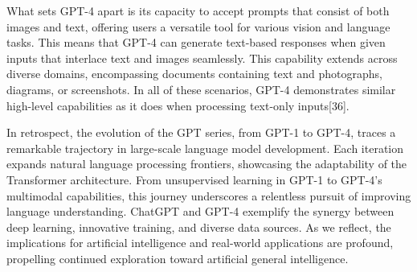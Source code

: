 \documentclass[conference]{IEEEtran}
\begin{document}
What sets GPT-4 apart is its capacity to accept prompts that consist of both images and text, offering users a versatile tool for various vision and language tasks. This means that GPT-4 can generate text-based responses when given inputs that interlace text and images seamlessly. This capability extends across diverse domains, encompassing documents containing text and photographs, diagrams, or screenshots. In all of these scenarios, GPT-4 demonstrates similar high-level capabilities as it does when processing text-only inputs[36].

In retrospect, the evolution of the GPT series, from GPT-1 to GPT-4, traces a remarkable trajectory in large-scale language model development. Each iteration expands natural language processing frontiers, showcasing the adaptability of the Transformer architecture. From unsupervised learning in GPT-1 to GPT-4's multimodal capabilities, this journey underscores a relentless pursuit of improving language understanding. ChatGPT and GPT-4 exemplify the synergy between deep learning, innovative training, and diverse data sources. As we reflect, the implications for artificial intelligence and real-world applications are profound, propelling continued exploration toward artificial general intelligence.
\end{document}
